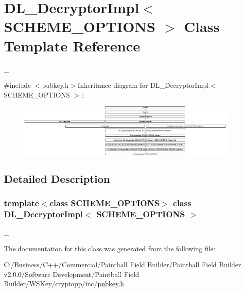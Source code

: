 \hypertarget{class_d_l___decryptor_impl}{
\section{DL\_\-DecryptorImpl$<$ SCHEME\_\-OPTIONS $>$ Class Template Reference}
\label{class_d_l___decryptor_impl}
}


\_\-  


{\ttfamily \#include $<$pubkey.h$>$}Inheritance diagram for DL\_\-DecryptorImpl$<$ SCHEME\_\-OPTIONS $>$::\begin{figure}[H]
\begin{center}
\leavevmode
\includegraphics[height=2.6771cm]{class_d_l___decryptor_impl}
\end{center}
\end{figure}


\subsection{Detailed Description}
\subsubsection*{template$<$class SCHEME\_\-OPTIONS$>$ class DL\_\-DecryptorImpl$<$ SCHEME\_\-OPTIONS $>$}

\_\- 

The documentation for this class was generated from the following file:\begin{DoxyCompactItemize}
\item 
C:/Business/C++/Commercial/Paintball Field Builder/Paintball Field Builder v2.0.0/Software Development/Paintball Field Builder/WSKey/cryptopp/inc/\hyperlink{pubkey_8h}{pubkey.h}\end{DoxyCompactItemize}
